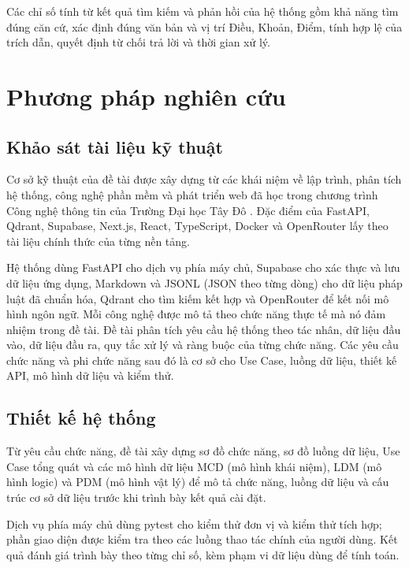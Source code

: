 \documentclass[12pt,a4paper,oneside]{report}
\begin{document}
Các chỉ số tính từ kết quả tìm kiếm và phản hồi của hệ thống gồm khả năng tìm đúng căn cứ, xác định đúng văn bản và vị trí Điều, Khoản, Điểm, tính hợp lệ của trích dẫn, quyết định từ chối trả lời và thời gian xử lý.


\section{Phương pháp nghiên cứu}
\subsection{Khảo sát tài liệu kỹ thuật}
Cơ sở kỹ thuật của đề tài được xây dựng từ các khái niệm về lập trình, phân tích hệ thống, công nghệ phần mềm và phát triển web đã học trong chương trình Công nghệ thông tin của Trường Đại học Tây Đô \cite{tdu_laptrinhcanban,tdu_pttkhttt,tdu_nmcpm,tdu_web,tdu_cdnnlt}. Đặc điểm của FastAPI, Qdrant, Supabase, Next.js, React, TypeScript, Docker và OpenRouter lấy theo tài liệu chính thức của từng nền tảng.

Hệ thống dùng FastAPI cho dịch vụ phía máy chủ, Supabase cho xác thực và lưu dữ liệu ứng dụng, Markdown và JSONL (JSON theo từng dòng) cho dữ liệu pháp luật đã chuẩn hóa, Qdrant cho tìm kiếm kết hợp và OpenRouter để kết nối mô hình ngôn ngữ. Mỗi công nghệ được mô tả theo chức năng thực tế mà nó đảm nhiệm trong đề tài.
Đề tài phân tích yêu cầu hệ thống theo tác nhân, dữ liệu đầu vào, dữ liệu đầu ra, quy tắc xử lý và ràng buộc của từng chức năng. Các yêu cầu chức năng và phi chức năng sau đó là cơ sở cho Use Case, luồng dữ liệu, thiết kế API, mô hình dữ liệu và kiểm thử.

\subsection{Thiết kế hệ thống}
Từ yêu cầu chức năng, đề tài xây dựng sơ đồ chức năng, sơ đồ luồng dữ liệu, Use Case tổng quát và các mô hình dữ liệu MCD (mô hình khái niệm), LDM (mô hình logic) và PDM (mô hình vật lý) để mô tả chức năng, luồng dữ liệu và cấu trúc cơ sở dữ liệu trước khi trình bày kết quả cài đặt.

Dịch vụ phía máy chủ dùng pytest cho kiểm thử đơn vị và kiểm thử tích hợp; phần giao diện được kiểm tra theo các luồng thao tác chính của người dùng. Kết quả đánh giá trình bày theo từng chỉ số, kèm phạm vi dữ liệu dùng để tính toán.
\end{document}
